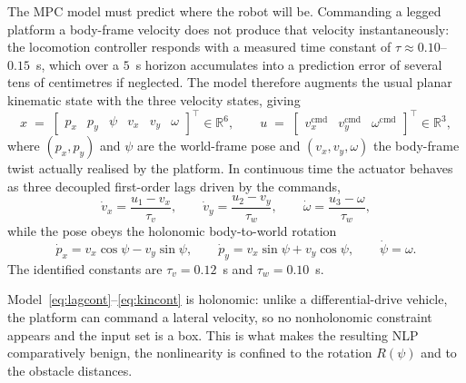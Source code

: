 \documentclass[11pt,a4paper]{article}
\newcommand{\R}{\mathbb{R}}
\begin{document}
The MPC model must predict where the robot will be. Commanding a legged platform
a body-frame velocity does not produce that velocity instantaneously: the locomotion controller responds with
a measured time constant of $\tau\approx0.10$--$0.15$~s, which over a $5$~s horizon accumulates into a
prediction error of several tens of centimetres if neglected. The model therefore augments the usual planar
kinematic state with the three velocity states, giving
\begin{equation}
  x \;=\; \begin{bmatrix} p_x & p_y & \psi & v_x & v_y & \omega\end{bmatrix}^{\!\top}\in\R^{6},
  \qquad
  u \;=\; \begin{bmatrix} v_x^{\mathrm{cmd}} & v_y^{\mathrm{cmd}} & \omega^{\mathrm{cmd}}\end{bmatrix}^{\!\top}\in\R^{3},
  \label{eq:state}
\end{equation}
where $(p_x,p_y)$ and $\psi$ are the world-frame pose and $(v_x,v_y,\omega)$ the body-frame twist actually
realised by the platform. In continuous time the actuator behaves as three decoupled first-order lags driven
by the commands,
\begin{equation}
  \dot v_x = \frac{u_1-v_x}{\tau_v},\qquad
  \dot v_y = \frac{u_2-v_y}{\tau_w},\qquad
  \dot \omega = \frac{u_3-\omega}{\tau_w},
  \label{eq:lagcont}
\end{equation}
while the pose obeys the holonomic body-to-world rotation
\begin{equation}
  \dot p_x = v_x\cos\psi - v_y\sin\psi,\qquad
  \dot p_y = v_x\sin\psi + v_y\cos\psi,\qquad
  \dot\psi = \omega .
  \label{eq:kincont}
\end{equation}
The identified constants are $\tau_v=0.12$~s and $\tau_w=0.10$~s.

Model~\eqref{eq:lagcont}--\eqref{eq:kincont} is holonomic: unlike a differential-drive vehicle, the platform
can command a lateral velocity, so no nonholonomic constraint appears and the input set is a box. This is what
makes the resulting NLP comparatively benign, the nonlinearity is confined to the rotation
$R(\psi)$ and to the obstacle distances.
\end{document}
